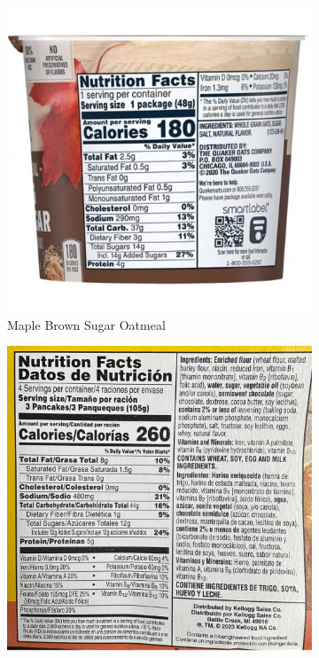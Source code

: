\documentclass{article}
\begin{document}
\begin{figure}[h]
    \centering
    \begin{subfigure}{0.2\textwidth}
        \centering
        \includegraphics[width=\linewidth]{oatmeal.png}
        \caption{Maple Brown Sugar Oatmeal}
        \label{fig:1}
    \end{subfigure}%
    \begin{subfigure}{0.2\textwidth}
        \centering
        \includegraphics[width=\linewidth]{pancake.jpg}

\end{subfigure}
\end{figure}
\end{document}
